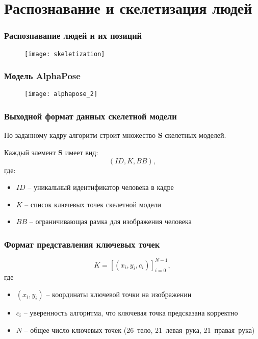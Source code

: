 \section{Распознавание и скелетизация людей}
\begin{frame}
    \frametitle{Распознавание людей и их позиций}
    \begin{figure}
        \centering
        \texttt{[image: skeletization]}
    \end{figure}
\end{frame}


\begin{frame}
    \frametitle{Модель AlphaPose}
    \begin{figure}
        \centering
        \texttt{[image: alphapose\_2]}
    \end{figure}
\end{frame}

\begin{frame}
    \frametitle{Выходной формат данных скелетной модели}
    По заданному кадру алгоритм строит множество $\mathbf{S}$ скелетных моделей.

    Каждый элемент $\mathbf{S}$ имеет вид:
    $$ \left(ID, K, BB\right), $$
    где:
    \begin{itemize}
        \item $ID$ -- уникальный идентификатор человека в кадре
        \item $K$ -- список ключевых точек скелетной модели
        \item $BB$ -- ограничивающая рамка для изображения человека
    \end{itemize}
\end{frame}

\begin{frame}
    \frametitle{Формат представления ключевых точек}
    $$ K = [(x_i, y_i, c_i)]_{i=0}^{N-1}, $$
    где
    \begin{itemize}
        \item $(x_i, y_i)$ -- координаты ключевой точки на изображении
        \item $c_i$ -- уверенность алгоритма, что ключевая точка предсказана корректно
        \item $N$ -- общее число ключевых точек (26~тело, 21~левая~рука, 21~правая~рука)
    \end{itemize}
\end{frame}

